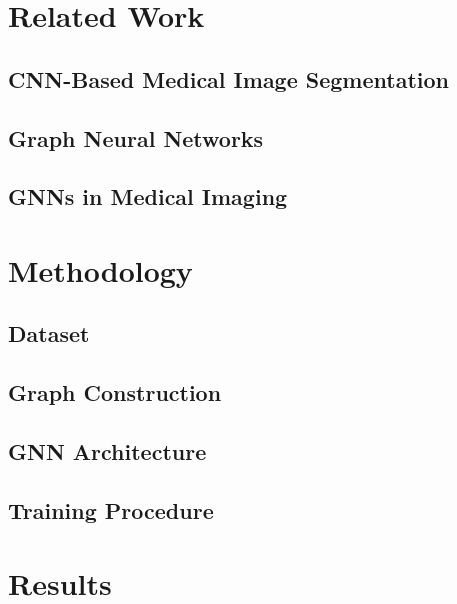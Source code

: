 \documentclass[conference]{IEEEtran}
\begin{document}
\section{Related Work}

\subsection{CNN-Based Medical Image Segmentation}

\subsection{Graph Neural Networks}

\subsection{GNNs in Medical Imaging}













\section{Methodology}


\subsection{Dataset}

\subsection{Graph Construction}

\subsection{GNN Architecture}

\subsection{Training Procedure}










\section{Results}
\end{document}
